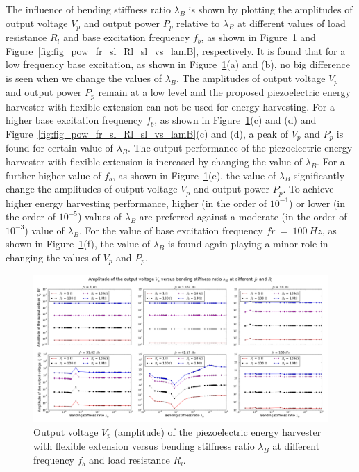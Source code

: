 \documentclass{elsarticle}
\begin{document}
The influence of bending stiffness ratio $\lambda_B$ is shown by plotting the amplitudes of output voltage $V_p$ and output power $P_p$ relative to $\lambda_B$ at different values of load resistance $R_l$ and base excitation frequency $f_b$, as shown in Figure~\ref{fig:fig_vol_fr_sl_Rl_sl_vs_lamB} and Figure~\ref{fig:fig_pow_fr_sl_Rl_sl_vs_lamB}, respectively. It is found that for a low frequency base excitation, as shown in Figure~\ref{fig:fig_vol_fr_sl_Rl_sl_vs_lamB}(a) and (b), no big difference is seen when we change the values of $\lambda_B$. The amplitudes of output voltage $V_p$ and output power $P_p$ remain at a low level and the proposed piezoelectric energy harvester with flexible extension can not be used for energy harvesting. For a higher base excitation frequency $f_b$, as shown in Figure~\ref{fig:fig_vol_fr_sl_Rl_sl_vs_lamB}(c) and (d) and Figure~\ref{fig:fig_pow_fr_sl_Rl_sl_vs_lamB}(c) and (d), a peak of $V_p$ and $P_p$ is found for certain value of $\lambda_B$. The output performance of the piezoelectric energy harvester with flexible extension is increased by changing the value of $\lambda_B$. For a further higher value of $f_b$, as shown in Figure~\ref{fig:fig_vol_fr_sl_Rl_sl_vs_lamB}(e), the value of $\lambda_B$ significantly change the amplitudes of output voltage $V_p$ and output power $P_p$. To achieve higher energy harvesting performance, higher (in the order of $10^{-1}$) or lower (in the order of $10^{-5}$) values of $\lambda_B$ are preferred against a moderate (in the order of $10^{-3}$) value of $\lambda_B$. For the value of base excitation frequency $fr\ =\ 100\ Hz$, as shown in Figure~\ref{fig:fig_vol_fr_sl_Rl_sl_vs_lamB}(f), the value of $\lambda_B$ is found again playing a minor role in changing the values of $V_p$ and $P_p$.



\begin{figure}[!htbp]
    \centering
    \includegraphics[width=\textwidth]{./fig_vol_fr_sl_Rl_sl_vs_lamB}
    \caption{Output voltage $V_p$ (amplitude) of the piezoelectric energy harvester with flexible extension versus bending stiffness ratio $\lambda_B$ at different frequency $f_b$ and load resistance $R_l$. }
    \label{fig:fig_vol_fr_sl_Rl_sl_vs_lamB}
\end{figure}
\end{document}

